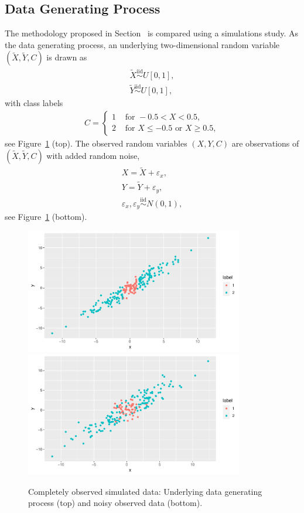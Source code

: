 \documentclass[12pt, twoside]{article}
\newcommand{\1}{\mathbb{1}}
\newcommand{\iid}{\overset{\text{iid}}{\sim}}
\begin{document}
\subsection{Data Generating Process}
The methodology proposed in Section~\label{treatment_of_missing_values_in_cart} is compared using a simulations study.
As the data generating process, an underlying two-dimensional random variable $(\tilde X, \tilde Y, C)$ is drawn as
\begin{eqnarray}
\tilde X \iid U[0, 1], \nonumber \\
\tilde Y \iid U[0, 1],
\end{eqnarray}
with class labels 
\begin{eqnarray}
C = 
\begin{cases}
1 & \text{ for } -0.5 < X < 0.5, \\
2 & \text{ for } X \leq -0.5 \text{ or } X \geq 0.5,
\end{cases}
\end{eqnarray}
see Figure~\ref{fig:simu_data} (top).
%
The observed random variables $(X, Y, C)$ are observations of $(\tilde X, \tilde Y, C)$ with added random noise, 
\begin{eqnarray}
X = \tilde X + \varepsilon_x, \nonumber \\
Y = \tilde Y + \varepsilon_y, \nonumber \\
\varepsilon_x, \varepsilon_y \iid N(0, 1),
\end{eqnarray}
see Figure~\ref{fig:simu_data} (bottom).
%
\begin{figure}[hp]
	\centering
	\includegraphics[width=0.85\textwidth]{plots/dat_underlying.pdf}
    \includegraphics[width=0.85\textwidth]{plots/dat.pdf}
	\caption{Completely observed simulated data: Underlying data generating process (top) and noisy observed data (bottom).}
	\label{fig:simu_data}
\end{figure}
\end{document}
